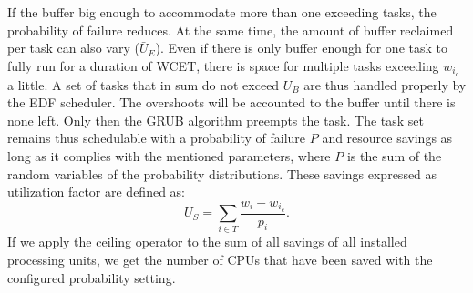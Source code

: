 \documentclass[]{scrartcl}
\begin{document}
If the buffer big enough to accommodate more than one exceeding tasks, the probability of failure reduces.
At the same time, the amount of buffer reclaimed per task can also vary ($\bar U_E$). 
Even if there is only buffer enough for one task to fully run for a duration of WCET, there is space for multiple tasks exceeding $w_{i_c}$ a little.
A set of tasks that in sum do not exceed $U_B$ are thus handled properly by the EDF scheduler. 
The overshoots will be accounted to the buffer until there is none left. Only then the GRUB algorithm preempts the task.
The task set remains thus schedulable with a probability of failure $P$ and resource savings as long as it complies with the mentioned parameters, where $P$ is the sum of the random variables of the probability distributions. %
These savings expressed as utilization factor are defined as:
\begin{equation}
	U_S = \sum_{i \in T} \frac{w_i - w_{i_c}}{p_i}.
\end{equation}
If we apply the ceiling operator to the sum of all savings of all installed processing units, we get the number of CPUs that have been saved with the configured probability setting.





%
%
%
%
%
%
\end{document}
